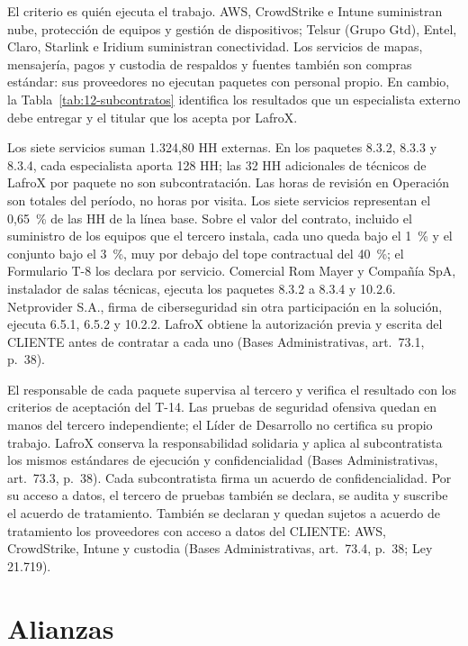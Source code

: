 
El criterio es quién ejecuta el trabajo. AWS, CrowdStrike e Intune suministran nube, protección de equipos y gestión de dispositivos; Telsur (Grupo Gtd), Entel, Claro, Starlink e Iridium suministran conectividad. Los servicios de mapas, mensajería, pagos y custodia de respaldos y fuentes también son compras estándar: sus proveedores no ejecutan paquetes con personal propio. En cambio, la Tabla~\ref{tab:12-subcontratos} identifica los resultados que un especialista externo debe entregar y el titular que los acepta por LafroX.


Los siete servicios suman 1.324,80 HH externas. En los paquetes 8.3.2, 8.3.3 y 8.3.4, cada especialista aporta 128 HH; las 32 HH adicionales de técnicos de LafroX por paquete no son subcontratación. Las horas de revisión en Operación son totales del período, no horas por visita. Los siete servicios representan el 0,65~\% de las HH de la línea base. Sobre el valor del contrato, incluido el suministro de los equipos que el tercero instala, cada uno queda bajo el 1~\% y el conjunto bajo el 3~\%, muy por debajo del tope contractual del 40~\%; el Formulario T-8 los declara por servicio. Comercial Rom Mayer y Compañía SpA, instalador de salas técnicas, ejecuta los paquetes 8.3.2 a 8.3.4 y 10.2.6. Netprovider S.A., firma de ciberseguridad sin otra participación en la solución, ejecuta 6.5.1, 6.5.2 y 10.2.2. LafroX obtiene la autorización previa y escrita del CLIENTE antes de contratar a cada uno (Bases Administrativas, art.~73.1, p.~38).

El responsable de cada paquete supervisa al tercero y verifica el resultado con los criterios de aceptación del T-14. Las pruebas de seguridad ofensiva quedan en manos del tercero independiente; el Líder de Desarrollo no certifica su propio trabajo. LafroX conserva la responsabilidad solidaria y aplica al subcontratista los mismos estándares de ejecución y confidencialidad (Bases Administrativas, art.~73.3, p.~38). Cada subcontratista firma un acuerdo de confidencialidad. Por su acceso a datos, el tercero de pruebas también se declara, se audita y suscribe el acuerdo de tratamiento. También se declaran y quedan sujetos a acuerdo de tratamiento los proveedores con acceso a datos del CLIENTE: AWS, CrowdStrike, Intune y custodia (Bases Administrativas, art.~73.4, p.~38; Ley 21.719).

\section{Alianzas}

